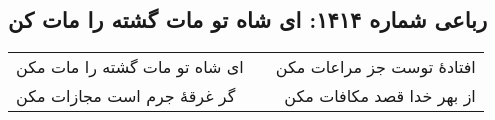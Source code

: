 \begin{center}
\section*{رباعی شماره ۱۴۱۴: ای شاه تو مات گشته را مات کن}
\label{sec:1414}
\begin{longtable}{l p{0.5cm} r}
ای شاه تو مات گشته را مات مکن
&&
افتادهٔ توست جز مراعات مکن
\\
گر غرقهٔ جرم است مجازات مکن
&&
از بهر خدا قصد مکافات مکن
\\
\end{longtable}
\end{center}
